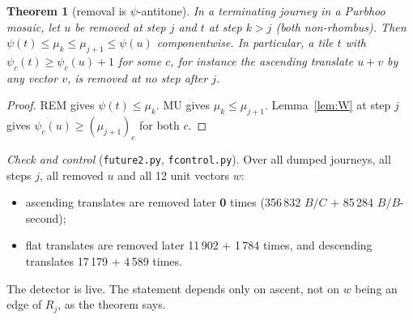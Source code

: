 \documentclass[11pt]{article}
\newtheorem{theorem}{Theorem}\newtheorem{lemma}[theorem]{Lemma}\newtheorem{proposition}[theorem]{Proposition}
\theoremstyle{definition}\newtheorem{definition}[theorem]{Definition}\newtheorem{remark}[theorem]{Remark}
\begin{document}
\begin{theorem}[removal is $\psi$-antitone]\label{thm:F}
In a terminating journey in a Purbhoo mosaic, let $u$ be removed at step $j$ and $t$ at step $k>j$ (both non-rhombus). Then $\psi(t)\le\mu_k\le\mu_{j+1}\le\psi(u)$ componentwise. In particular, a tile $t$ with $\psi_c(t)\ge\psi_c(u)+1$ for some $c$, for instance the ascending translate $u+v$ by any vector $v$, is removed at no step after $j$.
\end{theorem}
\begin{proof}
REM gives $\psi(t)\le\mu_k$. MU gives $\mu_k\le\mu_{j+1}$. Lemma~\ref{lem:W} at step $j$ gives $\psi_c(u)\ge(\mu_{j+1})_c$ for both $c$.
\end{proof}
\noindent\emph{Check and control} (\texttt{future2.py}, \texttt{fcontrol.py}). Over all dumped journeys, all steps $j$, all removed $u$ and all 12 unit vectors $w$:
\begin{itemize}
\item ascending translates are removed later \textbf{0} times (356\,832 $B/C$ + 85\,284 $B/B$-second);
\item flat translates are removed later 11\,902 + 1\,784 times, and descending translates 17\,179 + 4\,589 times.
\end{itemize}
The detector is live. The statement depends only on ascent, not on $w$ being an edge of $R_j$, as the theorem says.
\end{document}
